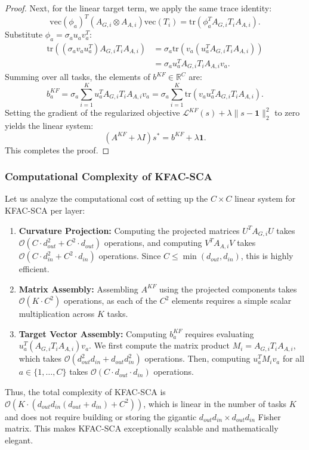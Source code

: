 \documentclass{article}
\theoremstyle{plain}
\theoremstyle{definition}
\theoremstyle{remark}
\begin{document}
\begin{proof}
Next, for the linear target term, we apply the same trace identity:
\begin{equation}
    \text{vec}(\phi_a)^T (A_{G,i} \otimes A_{A,i}) \text{vec}(T_i) = \text{tr}\left( \phi_a^T A_{G,i} T_i A_{A,i} \right).
\end{equation}
Substitute $\phi_a = \sigma_a u_a v_a^T$:
\begin{align}
    \text{tr}\left( (\sigma_a v_a u_a^T) A_{G,i} T_i A_{A,i} \right) &= \sigma_a \text{tr}\left( v_a (u_a^T A_{G,i} T_i A_{A,i}) \right) \nonumber \\
    &= \sigma_a u_a^T A_{G,i} T_i A_{A,i} v_a.
\end{align}
Summing over all tasks, the elements of $b^{KF} \in \mathbb{R}^C$ are:
\begin{equation}
    b^{KF}_a = \sigma_a \sum_{i=1}^K u_a^T A_{G,i} T_i A_{A,i} v_a = \sigma_a \sum_{i=1}^K \text{tr}\left( v_a u_a^T A_{G,i} T_i A_{A,i} \right).
\end{equation}
Setting the gradient of the regularized objective $\mathcal{L}^{KF}(s) + \lambda \|s - \mathbf{1}\|_2^2$ to zero yields the linear system:
\begin{equation}
    (A^{KF} + \lambda I) s^* = b^{KF} + \lambda \mathbf{1}.
\end{equation}
This completes the proof.
\end{proof}

\subsubsection{Computational Complexity of KFAC-SCA}
Let us analyze the computational cost of setting up the $C \times C$ linear system for KFAC-SCA per layer:
\begin{enumerate}
    \item \textbf{Curvature Projection:} Computing the projected matrices $U^T A_{G,i} U$ takes $\mathcal{O}(C \cdot d_{out}^2 + C^2 \cdot d_{out})$ operations, and computing $V^T A_{A,i} V$ takes $\mathcal{O}(C \cdot d_{in}^2 + C^2 \cdot d_{in})$ operations. Since $C \le \min(d_{out}, d_{in})$, this is highly efficient.
    \item \textbf{Matrix Assembly:} Assembling $A^{KF}$ using the projected components takes $\mathcal{O}(K \cdot C^2)$ operations, as each of the $C^2$ elements requires a simple scalar multiplication across $K$ tasks.
    \item \textbf{Target Vector Assembly:} Computing $b^{KF}_a$ requires evaluating $u_a^T (A_{G,i} T_i A_{A,i}) v_a$. We first compute the matrix product $M_i = A_{G,i} T_i A_{A,i}$, which takes $\mathcal{O}(d_{out}^2 d_{in} + d_{out} d_{in}^2)$ operations. Then, computing $u_a^T M_i v_a$ for all $a \in \{1, \dots, C\}$ takes $\mathcal{O}(C \cdot d_{out} \cdot d_{in})$ operations.
\end{enumerate}
Thus, the total complexity of KFAC-SCA is $\mathcal{O}\left(K \cdot (d_{out} d_{in}(d_{out} + d_{in}) + C^2)\right)$, which is linear in the number of tasks $K$ and does not require building or storing the gigantic $d_{out} d_{in} \times d_{out} d_{in}$ Fisher matrix. This makes KFAC-SCA exceptionally scalable and mathematically elegant.
\end{document}
